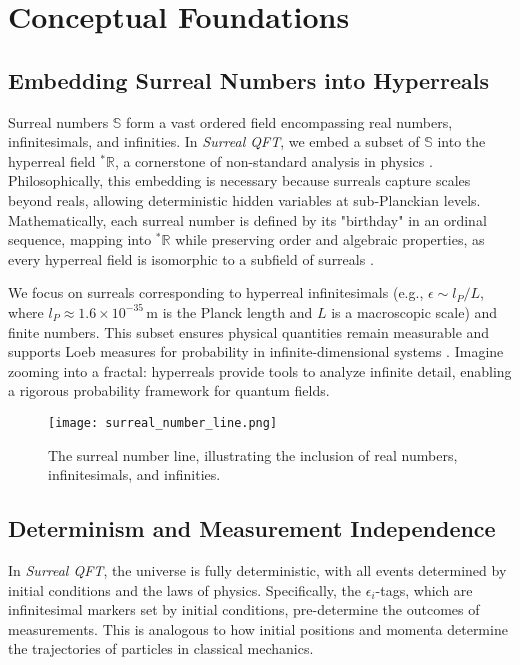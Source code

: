 \documentclass{article}
\begin{document}
\section{Conceptual Foundations}
\subsection{Embedding Surreal Numbers into Hyperreals}
Surreal numbers \(\mathbb{S}\) form a vast ordered field encompassing real numbers, infinitesimals, and infinities. In \textit{Surreal QFT}, we embed a subset of \(\mathbb{S}\) into the hyperreal field \({}^*\mathbb{R}\), a cornerstone of non-standard analysis in physics \cite{Goldblatt1998}. Philosophically, this embedding is necessary because surreals capture scales beyond reals, allowing deterministic hidden variables at sub-Planckian levels. Mathematically, each surreal number is defined by its "birthday" in an ordinal sequence, mapping into \({}^*\mathbb{R}\) while preserving order and algebraic properties, as every hyperreal field is isomorphic to a subfield of surreals \cite{Ehrlich2012}.

We focus on surreals corresponding to hyperreal infinitesimals (e.g., \(\epsilon \sim l_P / L\), where \(l_P \approx 1.6 \times 10^{-35} \, \text{m}\) is the Planck length and \(L\) is a macroscopic scale) and finite numbers. This subset ensures physical quantities remain measurable and supports Loeb measures for probability in infinite-dimensional systems \cite{Albeverio1986}. Imagine zooming into a fractal: hyperreals provide tools to analyze infinite detail, enabling a rigorous probability framework for quantum fields.

\begin{figure}[h]
    \centering
    \texttt{[image: surreal\_number\_line.png]}
    \caption{The surreal number line, illustrating the inclusion of real numbers, infinitesimals, and infinities.}
    \label{fig:surreal_line}
\end{figure}

\subsection{Determinism and Measurement Independence}
In \textit{Surreal QFT}, the universe is fully deterministic, with all events determined by initial conditions and the laws of physics. Specifically, the \(\epsilon_i\)-tags, which are infinitesimal markers set by initial conditions, pre-determine the outcomes of measurements. This is analogous to how initial positions and momenta determine the trajectories of particles in classical mechanics.
\end{document}
